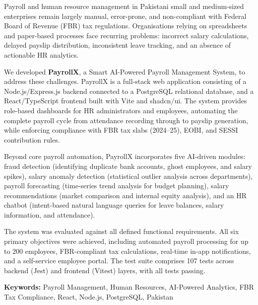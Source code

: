 \documentclass[12pt,a4paper]{report}
\begin{document}
Payroll and human resource management in Pakistani small and medium-sized enterprises remain largely manual, error-prone, and non-compliant with Federal Board of Revenue (FBR) tax regulations. Organisations relying on spreadsheets and paper-based processes face recurring problems: incorrect salary calculations, delayed payslip distribution, inconsistent leave tracking, and an absence of actionable HR analytics.

We developed \textbf{PayrollX}, a Smart AI-Powered Payroll Management System, to address these challenges. PayrollX is a full-stack web application consisting of a Node.js/Express.js backend connected to a PostgreSQL relational database, and a React/TypeScript frontend built with Vite and shadcn/ui. The system provides role-based dashboards for HR administrators and employees, automating the complete payroll cycle from attendance recording through to payslip generation, while enforcing compliance with FBR tax slabs (2024--25), EOBI, and SESSI contribution rules.

Beyond core payroll automation, PayrollX incorporates five AI-driven modules: fraud detection (identifying duplicate bank accounts, ghost employees, and salary spikes), salary anomaly detection (statistical outlier analysis across departments), payroll forecasting (time-series trend analysis for budget planning), salary recommendations (market comparison and internal equity analysis), and an HR chatbot (intent-based natural language queries for leave balances, salary information, and attendance).

The system was evaluated against all defined functional requirements. All six primary objectives were achieved, including automated payroll processing for up to 200 employees, FBR-compliant tax calculations, real-time in-app notifications, and a self-service employee portal. The test suite comprises 107 tests across backend (Jest) and frontend (Vitest) layers, with all tests passing.

\textbf{Keywords:} Payroll Management, Human Resources, AI-Powered Analytics, FBR Tax Compliance, React, Node.js, PostgreSQL, Pakistan

\tableofcontents

\listoftables
{}
\end{document}
